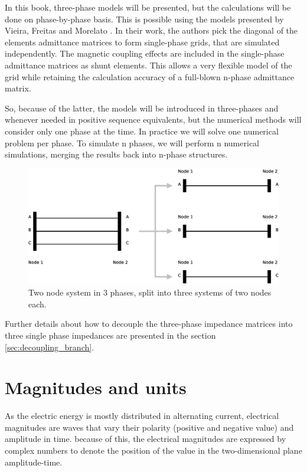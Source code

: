 \documentclass[a4paper,twoside,fleqn]{tufte-book}
\begin{document}
In this book, three-phase models will be presented, but the calculations will be done on phase-by-phase basis. This is possible using the models presented by Vieira, Freitas and Morelato \cite{vieira2004phase}. In their work, the authors pick the diagonal of the elements admittance matrices to form single-phase grids, that are simulated independently. The magnetic coupling effects are included in the single-phase admittance matrices as shunt elements. This allows a very flexible model of the grid while retaining the calculation accuracy of a full-blown n-phase admittance matrix.

So, because of the latter, the models will be introduced in three-phases and whenever needed in positive sequence equivalents, but the numerical methods will consider only one phase at the time. In practice we will solve one numerical problem per phase. To simulate n phases, we will perform n numerical simulations, merging the results back into n-phase structures.

\begin{figure}
  \includegraphics[width=\linewidth]{img/3p_to_1p.eps}
  \caption{Two node system in 3 phases, split into three systems of two nodes each.}
  \label{fig:3p_to_1p}
\end{figure}

Further details about how to decouple the three-phase impedance matrices into three single phase impedances are presented in the section \ref{sec:decoupling_branch}.

\chapter{Magnitudes and units}

As the electric energy is mostly distributed in alternating current, electrical magnitudes are waves that vary their polarity (positive and negative value) and amplitude in time. because of this, the electrical magnitudes are expressed by complex numbers to denote the position of the value in the two-dimensional plane amplitude-time. 
\end{document}
